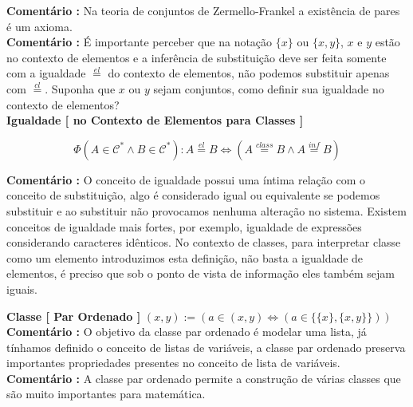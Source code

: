 \documentclass[10pt,a4paper]{report}
\begin{document}
\textbf{Comentário :} Na teoria de conjuntos de Zermello-Frankel a existência de pares é um axioma.\\

\textbf{Comentário :} É importante perceber que na notação $ \{x\} $ ou $ \{x,y\} $, $x$ e $y$ estão no contexto de elementos e a inferência de substituição deve ser feita somente com a igualdade $ \overset{el}{=} $ do contexto de elementos, não podemos substituir apenas com $ \overset{cl}{=} $. Suponha que $ x $ ou $y$ sejam conjuntos, como definir sua igualdade no contexto de elementos?\\

\textbf{Igualdade [ no Contexto de Elementos para Classes ]} 

$$ \Phi( A \in \mathcal{C}^* \wedge B \in \mathcal{C}^* ) : A \overset{el}{=} B \iff ( A \overset{class}{=} B \wedge A \overset{inf}{=} B ) $$

\textbf{Comentário :} O conceito de igualdade possui uma íntima relação com o conceito de substituição, algo é considerado igual ou equivalente se podemos substituir e ao substituir não provocamos nenhuma alteração no sistema. Existem conceitos de igualdade mais fortes, por exemplo, igualdade de expressões considerando caracteres idênticos. No contexto de classes, para interpretar classe como um elemento introduzimos esta definição, não basta a igualdade de elementos, é preciso que sob o ponto de vista de informação eles também sejam iguais.

\hspace{\baselineskip}

\textbf{Classe [ Par Ordenado ]} $ (x,y) := ( a \in (x,y) \iff ( a \in \{ \{x\} , \{ x,y \}  \} ) ) $\\

\textbf{Comentário :} O objetivo da classe par ordenado é modelar uma lista, já tínhamos definido o conceito de listas de variáveis, a classe par ordenado preserva importantes propriedades presentes no conceito de lista de variáveis.\\

\textbf{Comentário :} A classe par ordenado permite a construção de várias classes que são muito importantes para matemática.

\hspace{\baselineskip}
\end{document}
